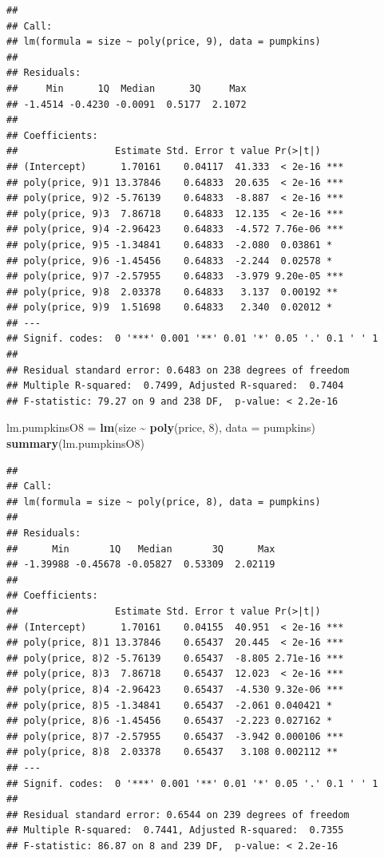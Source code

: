 \documentclass[
]{book}
\newenvironment{Shaded}{\begin{snugshade}}{\end{snugshade}}
\newcommand{\AttributeTok}[1]{\textcolor[rgb]{0.13,0.29,0.53}{#1}}
\newcommand{\DecValTok}[1]{\textcolor[rgb]{0.00,0.00,0.81}{#1}}
\newcommand{\FunctionTok}[1]{\textcolor[rgb]{0.13,0.29,0.53}{\textbf{#1}}}
\newcommand{\NormalTok}[1]{#1}
\newcommand{\OtherTok}[1]{\textcolor[rgb]{0.56,0.35,0.01}{#1}}
\newcommand{\SpecialCharTok}[1]{\textcolor[rgb]{0.81,0.36,0.00}{\textbf{#1}}}
\begin{document}
\begin{verbatim}
## 
## Call:
## lm(formula = size ~ poly(price, 9), data = pumpkins)
## 
## Residuals:
##     Min      1Q  Median      3Q     Max 
## -1.4514 -0.4230 -0.0091  0.5177  2.1072 
## 
## Coefficients:
##                 Estimate Std. Error t value Pr(>|t|)    
## (Intercept)      1.70161    0.04117  41.333  < 2e-16 ***
## poly(price, 9)1 13.37846    0.64833  20.635  < 2e-16 ***
## poly(price, 9)2 -5.76139    0.64833  -8.887  < 2e-16 ***
## poly(price, 9)3  7.86718    0.64833  12.135  < 2e-16 ***
## poly(price, 9)4 -2.96423    0.64833  -4.572 7.76e-06 ***
## poly(price, 9)5 -1.34841    0.64833  -2.080  0.03861 *  
## poly(price, 9)6 -1.45456    0.64833  -2.244  0.02578 *  
## poly(price, 9)7 -2.57955    0.64833  -3.979 9.20e-05 ***
## poly(price, 9)8  2.03378    0.64833   3.137  0.00192 ** 
## poly(price, 9)9  1.51698    0.64833   2.340  0.02012 *  
## ---
## Signif. codes:  0 '***' 0.001 '**' 0.01 '*' 0.05 '.' 0.1 ' ' 1
## 
## Residual standard error: 0.6483 on 238 degrees of freedom
## Multiple R-squared:  0.7499, Adjusted R-squared:  0.7404 
## F-statistic: 79.27 on 9 and 238 DF,  p-value: < 2.2e-16
\end{verbatim}

\begin{Shaded}
\begin{Highlighting}[]
\NormalTok{lm.pumpkinsO8 }\OtherTok{=} \FunctionTok{lm}\NormalTok{(size }\SpecialCharTok{\textasciitilde{}} \FunctionTok{poly}\NormalTok{(price, }\DecValTok{8}\NormalTok{), }\AttributeTok{data =}\NormalTok{ pumpkins)}
\FunctionTok{summary}\NormalTok{(lm.pumpkinsO8)}
\end{Highlighting}
\end{Shaded}

\begin{verbatim}
## 
## Call:
## lm(formula = size ~ poly(price, 8), data = pumpkins)
## 
## Residuals:
##      Min       1Q   Median       3Q      Max 
## -1.39988 -0.45678 -0.05827  0.53309  2.02119 
## 
## Coefficients:
##                 Estimate Std. Error t value Pr(>|t|)    
## (Intercept)      1.70161    0.04155  40.951  < 2e-16 ***
## poly(price, 8)1 13.37846    0.65437  20.445  < 2e-16 ***
## poly(price, 8)2 -5.76139    0.65437  -8.805 2.71e-16 ***
## poly(price, 8)3  7.86718    0.65437  12.023  < 2e-16 ***
## poly(price, 8)4 -2.96423    0.65437  -4.530 9.32e-06 ***
## poly(price, 8)5 -1.34841    0.65437  -2.061 0.040421 *  
## poly(price, 8)6 -1.45456    0.65437  -2.223 0.027162 *  
## poly(price, 8)7 -2.57955    0.65437  -3.942 0.000106 ***
## poly(price, 8)8  2.03378    0.65437   3.108 0.002112 ** 
## ---
## Signif. codes:  0 '***' 0.001 '**' 0.01 '*' 0.05 '.' 0.1 ' ' 1
## 
## Residual standard error: 0.6544 on 239 degrees of freedom
## Multiple R-squared:  0.7441, Adjusted R-squared:  0.7355 
## F-statistic: 86.87 on 8 and 239 DF,  p-value: < 2.2e-16
\end{verbatim}
\end{document}
